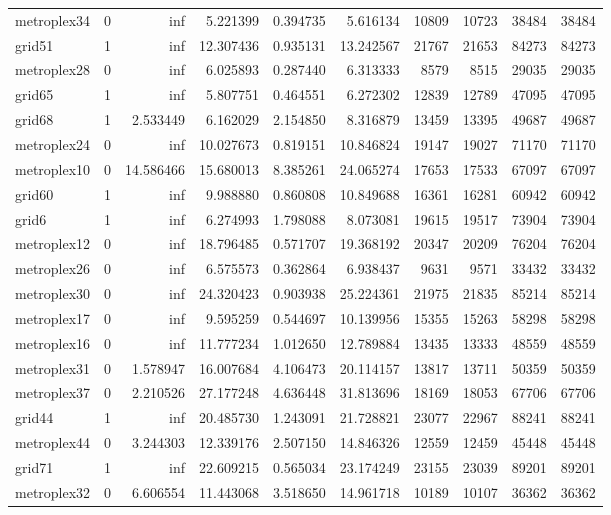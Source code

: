 \begin{longtable}{|l|r|r|r|r|r|r|r|r|r|}
metroplex34 & 0 & inf & 5.221399 & 0.394735 & 5.616134 & 10809 & 10723 & 38484 & 38484 \\
grid51 & 1 & inf & 12.307436 & 0.935131 & 13.242567 & 21767 & 21653 & 84273 & 84273 \\
metroplex28 & 0 & inf & 6.025893 & 0.287440 & 6.313333 & 8579 & 8515 & 29035 & 29035 \\
grid65 & 1 & inf & 5.807751 & 0.464551 & 6.272302 & 12839 & 12789 & 47095 & 47095 \\
grid68 & 1 & 2.533449 & 6.162029 & 2.154850 & 8.316879 & 13459 & 13395 & 49687 & 49687 \\
metroplex24 & 0 & inf & 10.027673 & 0.819151 & 10.846824 & 19147 & 19027 & 71170 & 71170 \\
metroplex10 & 0 & 14.586466 & 15.680013 & 8.385261 & 24.065274 & 17653 & 17533 & 67097 & 67097 \\
grid60 & 1 & inf & 9.988880 & 0.860808 & 10.849688 & 16361 & 16281 & 60942 & 60942 \\
grid6 & 1 & inf & 6.274993 & 1.798088 & 8.073081 & 19615 & 19517 & 73904 & 73904 \\
metroplex12 & 0 & inf & 18.796485 & 0.571707 & 19.368192 & 20347 & 20209 & 76204 & 76204 \\
metroplex26 & 0 & inf & 6.575573 & 0.362864 & 6.938437 & 9631 & 9571 & 33432 & 33432 \\
metroplex30 & 0 & inf & 24.320423 & 0.903938 & 25.224361 & 21975 & 21835 & 85214 & 85214 \\
metroplex17 & 0 & inf & 9.595259 & 0.544697 & 10.139956 & 15355 & 15263 & 58298 & 58298 \\
metroplex16 & 0 & inf & 11.777234 & 1.012650 & 12.789884 & 13435 & 13333 & 48559 & 48559 \\
metroplex31 & 0 & 1.578947 & 16.007684 & 4.106473 & 20.114157 & 13817 & 13711 & 50359 & 50359 \\
metroplex37 & 0 & 2.210526 & 27.177248 & 4.636448 & 31.813696 & 18169 & 18053 & 67706 & 67706 \\
grid44 & 1 & inf & 20.485730 & 1.243091 & 21.728821 & 23077 & 22967 & 88241 & 88241 \\
metroplex44 & 0 & 3.244303 & 12.339176 & 2.507150 & 14.846326 & 12559 & 12459 & 45448 & 45448 \\
grid71 & 1 & inf & 22.609215 & 0.565034 & 23.174249 & 23155 & 23039 & 89201 & 89201 \\
metroplex32 & 0 & 6.606554 & 11.443068 & 3.518650 & 14.961718 & 10189 & 10107 & 36362 & 36362 \\

\end{longtable}
